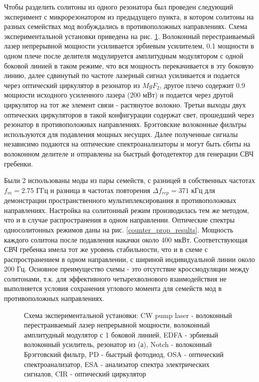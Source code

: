 Чтобы разделить солитоны из одного резонатора был проведен следующий эксперимент с микрорезонатором из предыдущего пункта, в котором солитоны на разных семействах мод возбуждались в противоположных направлениях. Схема экспериментальной установки приведена на рис. \ref{Setup_CounterProp}. Волоконный перестраиваемый лазер непрерывной мощности усиливается эрбиевым усилителем, 0.1 мощности в одном плече после делителя модулируется амплитудным модулятором с одной боковой линией в таком режиме, что вся мощность перекачивается в эту боковую линию, далее сдвинутый по частоте лазерный сигнал усиливается и подается через оптический циркулятор в резонатор из $MgF_2$, другое плечо содержит 0.9 мощности исходного усиленного лазера (200 мВт) и подается через другой циркулятор на тот же элемент связи - растянутое волокно. Третьи выходы двух оптических циркуляторов в такой конфигурации содержат свет, прошедший через резонатор в противоположных направлениях. Брэгговские волоконные фильтры используются для подавления мощных несущих. Далее полученные сигналы независимо подаются на оптические спектроанализаторы и могут быть сбиты на волоконном делителе и отправлены на быстрый фотодетектор для генерации СВЧ гребенки.

Были 2 использованы моды из пары семейств, с разницей в собственных частотах $f_m=2.75$ ГГц и разница в частотах повторения $\Delta f_{rep}=371$ кГц для демонстрации пространственного мультиплексирования в противоположных направлениях. Настройка на солитонный режим производилась тем же методом, что и в случае распространения в одном направлении. Оптические спектры односолитонных режимов даны на рис. \ref{counter_prop_results}. Мощность каждого солитона после подавления накачки около 400 мкВт. Соответствующая СВЧ гребенка имела тот же уровень стабильности, что и в схеме с распространением в одном направлении, с шириной индивидуальной линии около 200 Гц. Основное преимущество схемы - это отсутствие кроссмодуляции между солитонами, т.к. для эффективного четырехволнового взаимодействия не выполняется условия сохранения углового момента для семейств мод в противоположных направлениях.

\begin{figure}[ht]
\begin{minipage}[ht]{1\linewidth}
\end{minipage}
\caption{Схема экспериментальной установки: CW pump laser - волоконный перестраиваемый лазер непрерывной мощности, волоконный амплитудный модулятор с 1 боковой линией, EDFA - эрбиевый волоконный усилитель, резонатор из (а), Notch - волоконный Брэгговский фильтр, PD - быстрый фотодиод, OSA - оптический спектроанализатор, ESA - анализатор спектра электрических сигналов, CIR - оптический циркулятор}
\label{Setup_CounterProp}
\end{figure}

